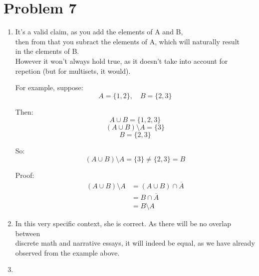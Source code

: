 \documentclass{article}
\begin{document}
\section*{Problem 7}
\begin{enumerate}
    \item %

    It's a valid claim, as you add the elements of A and B, \\
    then from that you subract the elements of A, which will naturally result \\
    in the elements of B. \\
    However it won't always hold true, as it doesn't take into account for repetion (but for multisets, it would). \\
    
    \medskip

    For example, suppose:
    \[
    A = \{1, 2\}, \quad B = \{2, 3\}
    \]

    Then:
    \[
    A \cup B = \{1, 2, 3\}
    \]
    \[
    (A \cup B) \setminus A = \{3\}
    \]
    \[
    B = \{2, 3\}
    \]

    So:
    \[
    (A \cup B) \setminus A = \{3\} \ne \{2, 3\} = B
    \]

    Proof:
    \begin{align*}
        (A \cup B) \setminus A &= (A \cup B) \cap \overline{A} \\
        &= B \cap \overline{A} \\
        &= B \setminus A
    \end{align*}

    \item %
    
    In this very specific context, she is correct. As there will be no overlap between \\
    discrete math and narrative essays, it will indeed be equal, as we have already \\
    observed from the example above.

    \item %
    

\end{enumerate}
\end{document}
